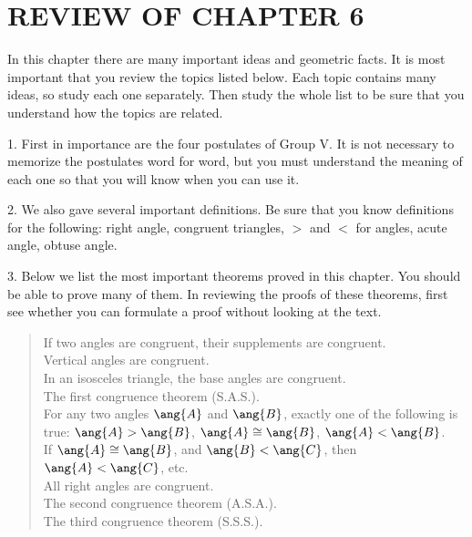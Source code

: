 \documentclass[11pt]{book}
\theoremstyle{bkplain}
\theoremstyle{XIplainnote}
\theoremstyle{bkplain}
\theoremstyle{bkplain}
\begin{document}
\section*{REVIEW OF CHAPTER 6}

In this chapter there are many important ideas and geometric facts. It is most
important that you review the topics listed below. Each topic contains many
ideas, so study each one separately. Then study the whole list to be sure that
you understand how the topics are related.

1. First in importance are the four postulates of Group V. It is not necessary
to memorize the postulates word for word, but you must understand the meaning
of each one so that you will know when you can use it.

2. We also gave several important definitions. Be sure that you know
definitions for the following: right angle, congruent triangles, $>$ and $<$
for angles, acute angle, obtuse angle.

3. Below we list the most important theorems proved in this chapter. You should
be able to prove many of them. In reviewing the proofs of these theorems, first
see whether you can formulate a proof without looking at the text.

\begin{quote}
If two angles are congruent, their supplements are congruent.\\
Vertical angles are congruent.\\
In an isosceles triangle, the base angles are congruent.\\
The first congruence theorem (S.A.S.).\\
For any two angles $\ang{A}$ and $\ang{B}$, exactly one of the following is
true: $\ang{A} > \ang{B}$, $\ang{A} \cong \ang{B}$, $\ang{A} < \ang{B}$.\\
If $\ang{A} \cong \ang{B}$, and $\ang{B} < \ang{C}$, then $\ang{A} < \ang{C}$,
etc.\\
All right angles are congruent.\\
The second congruence theorem (A.S.A.).\\
The third congruence theorem (S.S.S.).
\end{quote}
\end{document}
